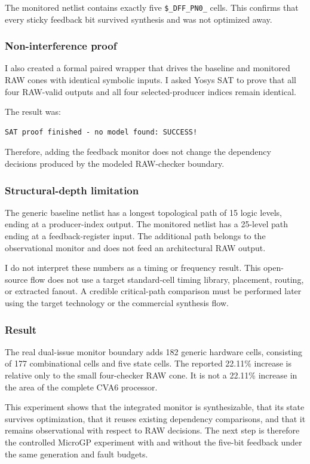 The monitored netlist contains exactly five \texttt{\$\_DFF\_PN0\_} cells.
This confirms that every sticky feedback bit survived synthesis and was not
optimized away.

\subsubsection*{Non-interference proof}

I also created a formal paired wrapper that drives the baseline and monitored
RAW cones with identical symbolic inputs. I asked Yosys SAT to prove that all
four RAW-valid outputs and all four selected-producer indices remain identical.

The result was:

\begin{verbatim}
SAT proof finished - no model found: SUCCESS!
\end{verbatim}

Therefore, adding the feedback monitor does not change the dependency decisions
produced by the modeled RAW-checker boundary.

\subsubsection*{Structural-depth limitation}

The generic baseline netlist has a longest topological path of 15 logic levels,
ending at a producer-index output. The monitored netlist has a 25-level path
ending at a feedback-register input. The additional path belongs to the
observational monitor and does not feed an architectural RAW output.

I do not interpret these numbers as a timing or frequency result. This
open-source flow does not use a target standard-cell timing library, placement,
routing, or extracted fanout. A credible critical-path comparison must be
performed later using the target technology or the commercial synthesis flow.

\subsubsection*{Result}

The real dual-issue monitor boundary adds 182 generic hardware cells, consisting
of 177 combinational cells and five state cells. The reported 22.11\% increase
is relative only to the small four-checker RAW cone. It is not a 22.11\%
increase in the area of the complete CVA6 processor.

This experiment shows that the integrated monitor is synthesizable, that its
state survives optimization, that it reuses existing dependency comparisons,
and that it remains observational with respect to RAW decisions. The next step
is therefore the controlled MicroGP experiment with and without the five-bit
feedback under the same generation and fault budgets.
